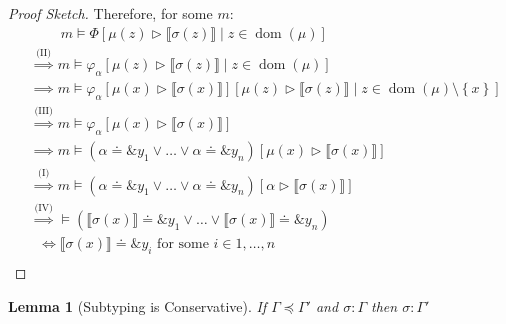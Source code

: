 \documentclass[twoside, english]{sdqthesis}
\newcommand{\set}[1]{\left\{ #1 \right\}}
\newcommand{\bbracket}[1]{\llbracket #1 \rrbracket}
\newcommand{\tr}[0]{\triangleright}
\DeclareMathOperator{\dom}{dom}
\newtheorem{lemma}[theorem]{Lemma}
\theoremstyle{definition}
\begin{document}
\begin{proof}[Proof Sketch]
  Therefore, for some $m$:
  \begin{align*}
    &\phantom{\implies}\ m \vDash \Phi[\mu(z) \tr \bbracket{\sigma(z)} \mid z \in \dom(\mu)] \\
    &\overset{\text{(II)}}{\implies} m \vDash \varphi_\alpha[\mu(z) \tr \bbracket{\sigma(z)} \mid z \in \dom(\mu)] \\
    &\overset{\text{}}{\implies} m \vDash \varphi_\alpha[\mu(x) \tr \bbracket{\sigma(x)}][\mu(z) \tr \bbracket{\sigma(z)} \mid z \in \dom(\mu) \setminus \set{x}] \\
    &\overset{\text{(III)}}{\implies} m \vDash \varphi_\alpha[\mu(x) \tr \bbracket{\sigma(x)}] \\
    &\overset{\text{}}{\implies} m \vDash (\alpha \doteq \&y_1 \vee \dots \vee \alpha \doteq \&y_n)[\mu(x) \tr \bbracket{\sigma(x)}] \\
    &\overset{\text{(I)}}{\implies} m \vDash (\alpha \doteq \&y_1 \vee \dots \vee \alpha \doteq \&y_n)[\alpha \tr \bbracket{\sigma(x)}] \\
    &\overset{\text{(IV)}}{\implies} \vDash (\bbracket{\sigma(x)} \doteq \&y_1 \vee \dots \vee \bbracket{\sigma(x)} \doteq \&y_n) \\
    &\ \ \,\overset{\text{}}{\Leftrightarrow} \bbracket{\sigma(x)} \doteq \&y_i \text{ for some $i \in 1,\dots,n$} \\
  \end{align*}
\end{proof}

\begin{lemma}[Subtyping is Conservative]\label{lem:conservative-subtype}
  If \hyperref[rule:Sub-Ctx]{$\Gamma \preceq \Gamma'$} and $\sigma : \Gamma$ then $\sigma : \Gamma'$
\end{lemma}
\end{document}
